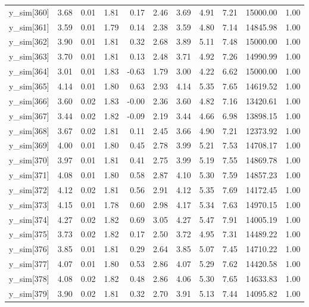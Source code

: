 \begin{table}[ht]
\begin{tabular}{rrrrrrrrrrr}
  y\_sim[360] & 3.68 & 0.01 & 1.81 & 0.17 & 2.46 & 3.69 & 4.91 & 7.21 & 15000.00 & 1.00 \\ 
  y\_sim[361] & 3.59 & 0.01 & 1.79 & 0.14 & 2.38 & 3.59 & 4.80 & 7.14 & 14845.98 & 1.00 \\ 
  y\_sim[362] & 3.90 & 0.01 & 1.81 & 0.32 & 2.68 & 3.89 & 5.11 & 7.48 & 15000.00 & 1.00 \\ 
  y\_sim[363] & 3.70 & 0.01 & 1.81 & 0.13 & 2.48 & 3.71 & 4.92 & 7.26 & 14990.99 & 1.00 \\ 
  y\_sim[364] & 3.01 & 0.01 & 1.83 & -0.63 & 1.79 & 3.00 & 4.22 & 6.62 & 15000.00 & 1.00 \\ 
  y\_sim[365] & 4.14 & 0.01 & 1.80 & 0.63 & 2.93 & 4.14 & 5.35 & 7.65 & 14619.52 & 1.00 \\ 
  y\_sim[366] & 3.60 & 0.02 & 1.83 & -0.00 & 2.36 & 3.60 & 4.82 & 7.16 & 13420.61 & 1.00 \\ 
  y\_sim[367] & 3.44 & 0.02 & 1.82 & -0.09 & 2.19 & 3.44 & 4.66 & 6.98 & 13898.15 & 1.00 \\ 
  y\_sim[368] & 3.67 & 0.02 & 1.81 & 0.11 & 2.45 & 3.66 & 4.90 & 7.21 & 12373.92 & 1.00 \\ 
  y\_sim[369] & 4.00 & 0.01 & 1.80 & 0.45 & 2.78 & 3.99 & 5.21 & 7.53 & 14708.17 & 1.00 \\ 
  y\_sim[370] & 3.97 & 0.01 & 1.81 & 0.41 & 2.75 & 3.99 & 5.19 & 7.55 & 14869.78 & 1.00 \\ 
  y\_sim[371] & 4.08 & 0.01 & 1.80 & 0.58 & 2.87 & 4.10 & 5.30 & 7.59 & 14857.23 & 1.00 \\ 
  y\_sim[372] & 4.12 & 0.02 & 1.81 & 0.56 & 2.91 & 4.12 & 5.35 & 7.69 & 14172.45 & 1.00 \\ 
  y\_sim[373] & 4.15 & 0.01 & 1.78 & 0.60 & 2.98 & 4.17 & 5.34 & 7.63 & 14970.15 & 1.00 \\ 
  y\_sim[374] & 4.27 & 0.02 & 1.82 & 0.69 & 3.05 & 4.27 & 5.47 & 7.91 & 14005.19 & 1.00 \\ 
  y\_sim[375] & 3.73 & 0.02 & 1.82 & 0.17 & 2.50 & 3.72 & 4.95 & 7.31 & 14489.22 & 1.00 \\ 
  y\_sim[376] & 3.85 & 0.01 & 1.81 & 0.29 & 2.64 & 3.85 & 5.07 & 7.45 & 14710.22 & 1.00 \\ 
  y\_sim[377] & 4.07 & 0.01 & 1.80 & 0.53 & 2.86 & 4.07 & 5.29 & 7.62 & 14420.58 & 1.00 \\ 
  y\_sim[378] & 4.08 & 0.02 & 1.82 & 0.48 & 2.86 & 4.06 & 5.30 & 7.65 & 14633.83 & 1.00 \\ 
  y\_sim[379] & 3.90 & 0.02 & 1.81 & 0.32 & 2.70 & 3.91 & 5.13 & 7.44 & 14095.82 & 1.00 \\ 

\end{tabular}
\end{table}
